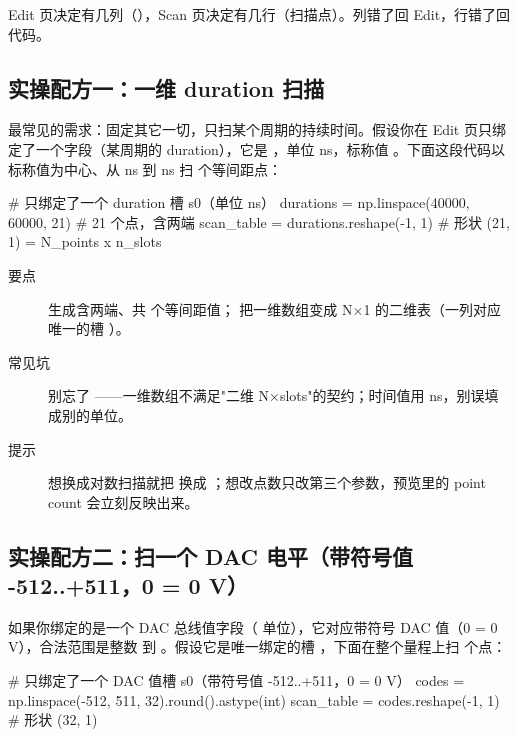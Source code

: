\documentclass[11pt,oneside,openany]{book}
\begin{document}
\begin{notebox}[一句话记忆]
Edit 页决定有几列（），Scan 页决定有几行（扫描点）。列错了回 Edit，行错了回代码。
\end{notebox}

\subsection{实操配方一：一维 duration 扫描}

最常见的需求：固定其它一切，只扫某个周期的持续时间。假设你在 Edit 页只绑定了一个字段（某周期的 duration），它是 ，单位 ns，标称值 。下面这段代码以标称值为中心、从  ns 到  ns 扫  个等间距点：

\begin{codeblock}[Python]
# 只绑定了一个 duration 槽 s0（单位 ns）
durations = np.linspace(40000, 60000, 21)   # 21 个点，含两端
scan_table = durations.reshape(-1, 1)        # 形状 (21, 1) = N_points x n_slots
\end{codeblock}

\begin{description}
\item[要点]  生成含两端、共  个等间距值； 把一维数组变成 N×1 的二维表（一列对应唯一的槽 ）。
\item[常见坑] 别忘了 ——一维数组不满足"二维 N×slots"的契约；时间值用 ns，别误填成别的单位。
\item[提示] 想换成对数扫描就把  换成 ；想改点数只改第三个参数，预览里的 point count 会立刻反映出来。
\end{description}

\subsection{实操配方二：扫一个 DAC 电平（带符号值 -512..+511，0 = 0 V）}

如果你绑定的是一个 DAC 总线值字段（\pyapi{[value]} 单位），它对应带符号 DAC 值（0 = 0 V），合法范围是整数  到 。假设它是唯一绑定的槽 ，下面在整个量程上扫  个点：

\begin{codeblock}[Python]
# 只绑定了一个 DAC 值槽 s0（带符号值 -512..+511，0 = 0 V）
codes = np.linspace(-512, 511, 32).round().astype(int)
scan_table = codes.reshape(-1, 1)            # 形状 (32, 1)
\end{codeblock}
\end{document}
